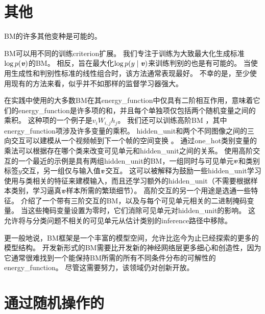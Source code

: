 \section{其他}
\label{sec:other_boltzmann_machines}
\gls{BM}的许多其他变种是可能的。

\gls{BM}可以用不同的训练\gls{criterion}扩展。
我们专注于训练为大致最大化生成标准$\log p(\boldsymbol{\mathit{v}})$的\gls{BM}。
相反，旨在最大化$\log p(y \mid \boldsymbol{\mathit{v}})$来训练判别的也是有可能的\citep{Larochelle+Bengio-2008-small}。
当使用生成性和判别性标准的线性组合时，该方法通常表现最好。
不幸的是，至少使用现有的方法来看，似乎并不如那样的监督学习器强大。

在实践中使用的大多数\gls{BM}在其\gls{energy_function}中仅具有二阶相互作用，意味着它们的\gls{energy_function}是许多项的和，并且每个单独项仅包括两个随机变量之间的乘积。
这种项的一个例子是$v_iW_{i,j}h_j$。
我们还可以训练高阶\gls{BM}\citep{sejnowski1987higher} ，其中\gls{energy_function}项涉及许多变量的乘积。
\gls{hidden_unit}和两个不同图像之间的三向交互可以建模从一个视频帧到下一个帧的空间变换 \citep{Memisevic+Hinton-2007,Memisevic+Hinton-2010}。
通过\gls{one_hot}类别变量的乘法可以根据存在哪个类来改变可见单元和\gls{hidden_unit}之间的关系\citep{Nair2009}。
使用高阶交互的一个最近的示例是具有两组\gls{hidden_unit}的\gls{BM}，一组同时与可见单元$\boldsymbol{\mathit{v}}$和类别标签$y$交互，另一组仅与输入值$\boldsymbol{\mathit{v}}$交互\citep{luo2011learning}。 %
这可以被解释为鼓励一些\gls{hidden_unit}学习使用与类相关的特征来建模输入，而且还学习额外的\gls{hidden_unit}（不需要根据样本类别，学习逼真$\boldsymbol{\mathit{v}}$样本所需的繁琐细节）。
高阶交互的另一个用途是选通一些特征。
\citet{Sohn-et-al-ICML2013} 介绍了一个带有三阶交互的\gls{BM}，以及与每个可见单元相关的二进制掩码变量。
当这些掩码变量设置为零时，它们消除可见单元对\gls{hidden_unit}的影响。
这允许将与分类问题不相关的可见单元从估计类别的\gls{inference}路径中移除。

更一般地说，\gls{BM}框架是一个丰富的模型空间，允许比迄今为止已经探索的更多的模型结构。
开发新形式的\gls{BM}需要比开发新的神经网络层更多细心和创造性，因为它通常很难找到一个能保持\gls{BM}所需的所有不同条件分布的可解性的\gls{energy_function}。
尽管这需要努力，该领域仍对创新开放。


\section{通过随机操作的}
\label{sec:back_propagation_through_random_operations}


